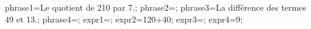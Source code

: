 \documentclass[exercice]{thedocument}%
\begin{document}
%
    \>phrase1=Le quotient de 210 par 7.;%
    \>phrase2=;%
    \>phrase3=La différence des termes 49 et 13.;%
    \>phrase4=;%
    \>expr1=;%
    \>expr2=120+40;%
    \>expr3=;%
    \>expr4=9;%
\end{document}
